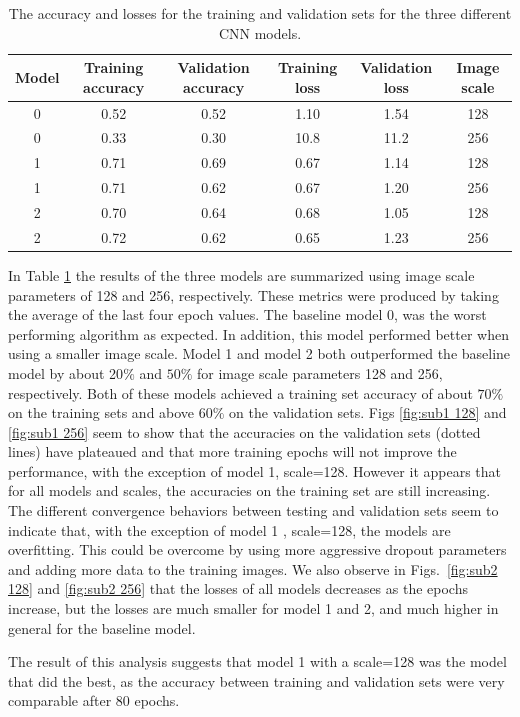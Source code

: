 \documentclass[10pt,a4paper]{article}
\begin{document}
\begin{table}[h]
\centering
\begin{tabular}{c|cc|cc|c}
Model & Training accuracy &  Validation accuracy & Training loss  & Validation loss & Image scale \\ \hline
0 & 0.52  & 0.52 & 1.10 & 1.54 & 128    \\
0 & 0.33  & 0.30 & 10.8 & 11.2 & 256    \\ \hline
1 & 0.71  & 0.69 & 0.67 & 1.14 & 128    \\
1 & 0.71  & 0.62 & 0.67 & 1.20 & 256   \\ \hline
2 & 0.70  & 0.64 & 0.68 & 1.05 & 128    \\
2 & 0.72  & 0.62 & 0.65 & 1.23 & 256 \\ \hline
\end{tabular}
\caption{The accuracy and losses for the training and validation sets for the three different CNN models.}
\label{Table: table1}
\end{table}
In Table \ref{Table: table1} the results of the three models are summarized using image scale parameters of 128 and 256, respectively. These metrics were produced by taking the average of the last four epoch values. The baseline model 0, was the worst performing algorithm as expected. In addition, this model performed better when using a smaller image scale. Model 1 and model 2 both outperformed the baseline model by about 20$\%$ and $50\%$ for image scale parameters 128 and 256, respectively. Both of these models achieved a training set accuracy of about $70\%$ on the training sets and above $60\%$ on the validation sets. Figs \ref{fig:sub1 128} and \ref{fig:sub1 256} seem to show that the accuracies on the validation sets (dotted lines) have plateaued and that more training epochs will not improve the performance, with the exception of model 1, scale=128. However it appears that for all models and scales, the accuracies on the training set are still increasing. The different convergence behaviors between testing and validation sets seem to indicate that, with the exception of model 1 , scale=128, the models are overfitting. This could be overcome by using more aggressive dropout parameters and adding more data to the training images. We also observe in Figs.~\ref{fig:sub2 128} and \ref{fig:sub2 256} that the losses of all models decreases as the epochs increase, but the losses are much smaller for model 1 and 2, and much higher in general for the baseline model.

The result of this analysis suggests that model 1 with a scale=128 was the model that did the best, as the accuracy between training and validation sets were very comparable after 80 epochs. 
\end{document}
